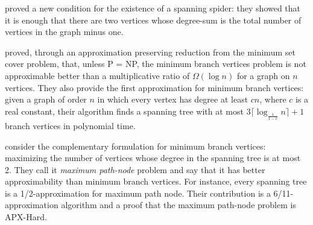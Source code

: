 \documentclass[12pt]{article}
\begin{document}
\cite{flandrin2008} proved a new condition for the existence of a spanning spider: they showed that it is enough that there are two vertices whose degree-sum is the total number of vertices in the graph minus one.

\cite{salamon2010} proved, through an approximation preserving reduction from the minimum set cover problem, that, unless P = NP, the minimum branch vertices problem is not approximable better than a multiplicative ratio of $\Omega(\log n)$ for a graph on $n$ vertices.
They also provide the first approximation for minimum branch vertices: given a graph of order $n$ in which every vertex has degree at least $cn$, where $c$ is a real constant, their algorithm finds a spanning tree with at most $3\lceil \log_{\frac{1}{1 - c}}n\rceil + 1$ branch vertices in polynomial time.

\cite{chimani2015} consider the complementary formulation for minimum branch vertices: maximizing the number of vertices whose degree in the spanning tree is at most 2.
They call it \emph{maximum path-node} problem and say that it has better approximability than minimum branch vertices. 
For instance, every spanning tree is a 1/2-approximation for maximum path node.
Their contribution is a 6/11-approximation algorithm and a proof that the maximum path-node problem is APX-Hard.



\end{document}
